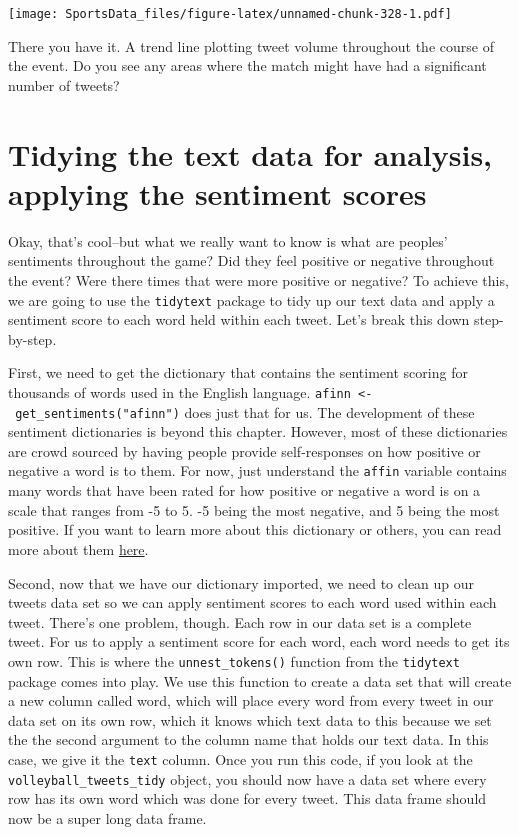 \documentclass[
]{book}
\begin{document}
\texttt{[image: SportsData\_files/figure-latex/unnamed-chunk-328-1.pdf]}

There you have it. A trend line plotting tweet volume throughout the course of the event. Do you see any areas where the match might have had a significant number of tweets?

\hypertarget{tidying-the-text-data-for-analysis-applying-the-sentiment-scores}{%
\section{Tidying the text data for analysis, applying the sentiment scores}\label{tidying-the-text-data-for-analysis-applying-the-sentiment-scores}}

Okay, that's cool--but what we really want to know is what are peoples' sentiments throughout the game? Did they feel positive or negative throughout the event? Were there times that were more positive or negative? To achieve this, we are going to use the \texttt{tidytext} package to tidy up our text data and apply a sentiment score to each word held within each tweet. Let's break this down step-by-step.

First, we need to get the dictionary that contains the sentiment scoring for thousands of words used in the English language. \texttt{afinn\ \textless{}-\ get\_sentiments("afinn")} does just that for us. The development of these sentiment dictionaries is beyond this chapter. However, most of these dictionaries are crowd sourced by having people provide self-responses on how positive or negative a word is to them. For now, just understand the \texttt{affin} variable contains many words that have been rated for how positive or negative a word is on a scale that ranges from -5 to 5. -5 being the most negative, and 5 being the most positive. If you want to learn more about this dictionary or others, you can read more about them \href{https://www.tidytextmining.com/sentiment.html}{here}.

Second, now that we have our dictionary imported, we need to clean up our tweets data set so we can apply sentiment scores to each word used within each tweet. There's one problem, though. Each row in our data set is a complete tweet. For us to apply a sentiment score for each word, each word needs to get its own row. This is where the \texttt{unnest\_tokens()} function from the \texttt{tidytext} package comes into play. We use this function to create a data set that will create a new column called word, which will place every word from every tweet in our data set on its own row, which it knows which text data to this because we set the the second argument to the column name that holds our text data. In this case, we give it the \texttt{text} column. Once you run this code, if you look at the \texttt{volleyball\_tweets\_tidy} object, you should now have a data set where every row has its own word which was done for every tweet. This data frame should now be a super long data frame.
\end{document}
